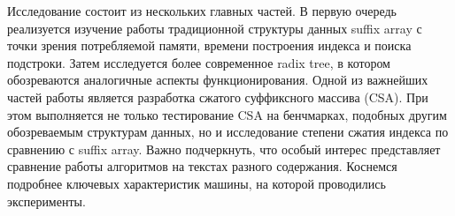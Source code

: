 
Исследование состоит из нескольких главных частей. В первую очередь реализуется изучение работы традиционной структуры
данных suffix array с точки зрения потребляемой памяти, времени построения индекса и поиска подстроки.
Затем исследуется более современное radix tree, в котором обозреваются аналогичные аспекты функционирования.
Одной из важнейших частей работы является разработка сжатого суффиксного массива (CSA).
При этом выполняется не только тестирование CSA на бенчмарках, подобных другим обозреваемым структурам данных,
но и исследование степени сжатия индекса по сравнению с suffix array.
Важно подчеркнуть, что особый интерес представляет сравнение работы алгоритмов на текстах разного содержания.
Коснемся подробнее ключевых характеристик машины, на которой проводились эксперименты.